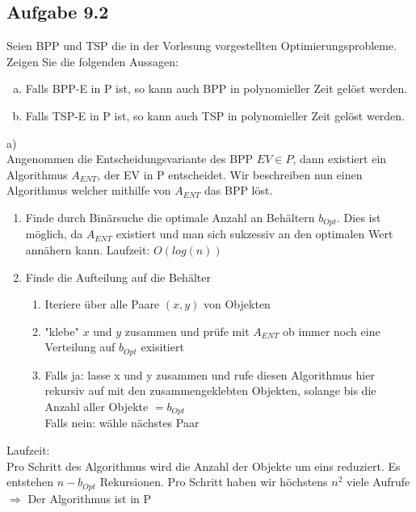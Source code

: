 \subsection*{Aufgabe 9.2}
Seien BPP und TSP die in der Vorlesung vorgestellten Optimierungsprobleme. Zeigen Sie die folgenden Aussagen:
\begin{enumerate}[(a)]
	\item Falls BPP-E in P ist, so kann auch BPP in polynomieller Zeit gelöst werden.
	\item Falls TSP-E in P ist, so kann auch TSP in polynomieller Zeit gelöst werden.
\end{enumerate}

a)\\
Angenommen die Entscheidungsvariante des BPP $EV \in P$, dann existiert ein Algorithmus $A_{ENT}$, der
EV in P entscheidet. Wir beschreiben nun einen Algorithmus welcher mithilfe von $A_{ENT}$ das BPP löst.
\begin{enumerate}

	\item Finde durch Binärsuche die optimale Anzahl an Behältern $b_{Opt}$. Dies ist möglich, da $A_{ENT}$
		existiert und man sich sukzessiv an den optimalen Wert annähern kann. Laufzeit: $O(log(n))$
	\item Finde die Aufteilung auf die Behälter
	\begin{enumerate}
		\item Iteriere über alle Paare $(x,y)$ von Objekten
		\item "klebe" $x$ und $y$ zusammen und prüfe mit $A_{ENT}$ ob immer noch eine Verteilung
			auf $b_{Opt}$ exisitiert
		\item Falls ja: lasse x und y zusammen und rufe diesen Algorithmus hier rekursiv auf mit den
			zusammengeklebten Objekten, solange bis die Anzahl aller Objekte $= b_{Opt}$\\
			Falls nein: wähle nächstes Paar
	\end{enumerate}
\end{enumerate}

Laufzeit:\\
Pro Schritt des Algorithmus wird die Anzahl der Objekte um eins reduziert. Es entstehen $n - b_{Opt}$
Rekursionen. Pro Schritt haben wir höchstens $n^2$ viele Aufrufe $\Rightarrow$ Der Algorithmus ist in P \\


